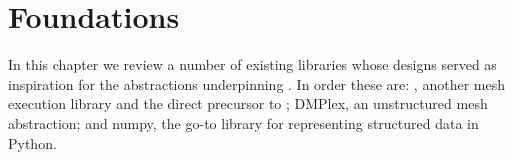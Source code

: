 \documentclass[thesis]{subfiles}
\begin{document}
\chapter{Foundations}



In this chapter we review a number of existing libraries whose designs served as inspiration for the abstractions underpinning .
In order these are:
, another mesh execution library and the direct precursor to ;
DMPlex, an unstructured mesh abstraction;
and numpy, the go-to library for representing structured data in Python.

\section{}




%
%



\end{document}
